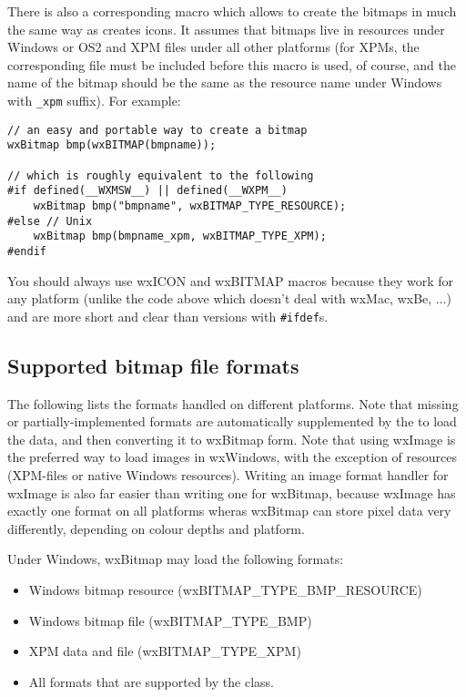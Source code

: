 There is also a corresponding  macro which allows
to create the bitmaps in much the same way as  creates
icons. It assumes that bitmaps live in resources under Windows or OS2 and XPM
files under all other platforms (for XPMs, the corresponding file must be
included before this macro is used, of course, and the name of the bitmap
should be the same as the resource name under Windows with {\tt \_xpm}
suffix). For example:

\begin{verbatim}
// an easy and portable way to create a bitmap
wxBitmap bmp(wxBITMAP(bmpname));

// which is roughly equivalent to the following
#if defined(__WXMSW__) || defined(__WXPM__)
    wxBitmap bmp("bmpname", wxBITMAP_TYPE_RESOURCE);
#else // Unix
    wxBitmap bmp(bmpname_xpm, wxBITMAP_TYPE_XPM);
#endif
\end{verbatim}

You should always use wxICON and wxBITMAP macros because they work for any
platform (unlike the code above which doesn't deal with wxMac, wxBe, ...) and
are more short and clear than versions with {\tt #ifdef}s.

\subsection{Supported bitmap file formats}\label{supportedbitmapformats}

The following lists the formats handled on different platforms. Note
that missing or partially-implemented formats are automatically supplemented
by the  to load the data, and then converting
it to wxBitmap form. Note that using wxImage is the preferred way to
load images in wxWindows, with the exception of resources (XPM-files or
native Windows resources). Writing an image format handler for wxImage
is also far easier than writing one for wxBitmap, because wxImage has
exactly one format on all platforms wheras wxBitmap can store pixel data
very differently, depending on colour depths and platform.


Under Windows, wxBitmap may load the following formats:

\begin{itemize}\itemsep=0pt
\item Windows bitmap resource (wxBITMAP\_TYPE\_BMP\_RESOURCE)
\item Windows bitmap file (wxBITMAP\_TYPE\_BMP)
\item XPM data and file (wxBITMAP\_TYPE\_XPM)
\item All formats that are supported by the  class.
\end{itemize}

